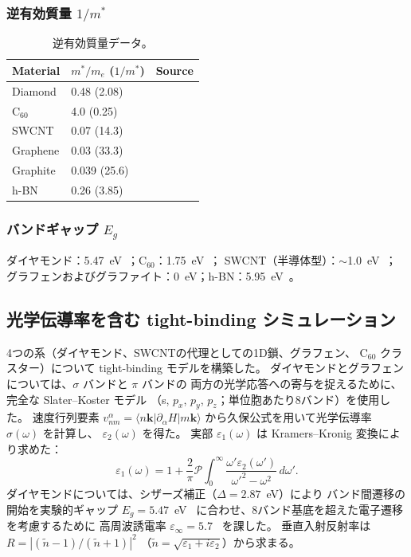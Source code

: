 \documentclass[twocolumn,showpacs,preprintnumbers,amsmath,amssymb,prb]{revtex4-2}
\begin{document}
\subsubsection{逆有効質量 $1/m^*$}

\begin{table}[h]
\caption{逆有効質量データ。}
\label{tab:invmass}
\begin{ruledtabular}
\begin{tabular}{lll}
  Material & $m^*/m_e$ ($1/m^*$) & Source \\
  \hline
  Diamond & 0.48 (2.08) & \cite{Ioffe} \\
  C$_{60}$ & 4.0 (0.25) & \cite{Gunnarsson1997} \\
  SWCNT & 0.07 (14.3) & \cite{Ajiki1993} \\
  Graphene & 0.03 (33.3) & \cite{Novoselov2005} \\
  Graphite & 0.039 (25.6) & \cite{Dresselhaus2002} \\
  h-BN & 0.26 (3.85) & \cite{Ioffe} \\
\end{tabular}
\end{ruledtabular}
\end{table}

\subsubsection{バンドギャップ $E_g$}

ダイヤモンド：5.47~eV~\cite{Clark1964}；C$_{60}$：1.75~eV~\cite{Lof1992}；
SWCNT（半導体型）：$\sim$1.0~eV~\cite{Saito1998}；
グラフェンおよびグラファイト：0~eV；h-BN：5.95~eV~\cite{Cassabois2016}。

\subsection{光学伝導率を含む tight-binding シミュレーション}

4つの系（ダイヤモンド、SWCNTの代理としての1D鎖、グラフェン、
C$_{60}$ クラスター）について tight-binding モデルを構築した。
ダイヤモンドとグラフェンについては、$\sigma$ バンドと $\pi$ バンドの
両方の光学応答への寄与を捉えるために、完全な Slater--Koster モデル
（s, $p_x$, $p_y$, $p_z$；単位胞あたり8バンド）を使用した。
速度行列要素 $v_{nm}^\alpha = \langle n\bm{k} | \partial_\alpha H | m\bm{k} \rangle$
から久保公式を用いて光学伝導率 $\sigma(\omega)$ を計算し、
$\varepsilon_2(\omega)$ を得た。
実部 $\varepsilon_1(\omega)$ は Kramers--Kronig 変換により求めた：
\begin{equation}
  \varepsilon_1(\omega) = 1 + \frac{2}{\pi} \mathcal{P}
  \int_0^\infty \frac{\omega'\varepsilon_2(\omega')}
  {\omega'^2 - \omega^2}\, d\omega'.
  \label{eq:KK}
\end{equation}
ダイヤモンドについては、シザーズ補正（$\Delta = 2.87$~eV）により
バンド間遷移の開始を実験的ギャップ $E_g = 5.47$~eV~\cite{Clark1964}
に合わせ、8バンド基底を超えた電子遷移を考慮するために
高周波誘電率 $\varepsilon_\infty = 5.7$~\cite{Palik1998} を課した。
垂直入射反射率は $R = |(\tilde{n}-1)/(\tilde{n}+1)|^2$
（$\tilde{n} = \sqrt{\varepsilon_1 + i\varepsilon_2}$）から求まる。
\end{document}
